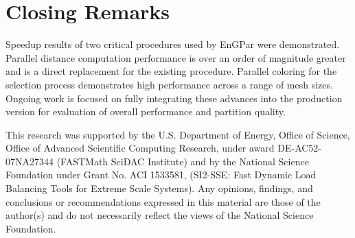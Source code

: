\documentclass[graybox]{svmult}
\begin{document}
\section{Closing Remarks} \label{sec:closing}
Speedup results of two critical procedures used by EnGPar were demonstrated.
Parallel distance computation performance is over an order of magnitude greater
and is a direct replacement for the existing procedure.
Parallel coloring for the selection process demonstrates high performance
across a range of mesh sizes.
Ongoing work is focused on fully integrating these advances into the production
version for evaluation of overall performance and partition quality.

\begin{acknowledgement}
This research was supported by the U.S. Department of Energy, Office of Science,
Office of Advanced Scientific Computing Research, under award DE-AC52-07NA27344
(FASTMath SciDAC Institute) and by the National Science Foundation under Grant
No. ACI 1533581, (SI2-SSE: Fast Dynamic Load Balancing Tools for Extreme Scale
Systems).
Any opinions, findings, and conclusions or recommendations expressed in this
material are those of the author(s) and do not necessarily reflect the views
of the National Science Foundation.
\end{acknowledgement}



\end{document}
